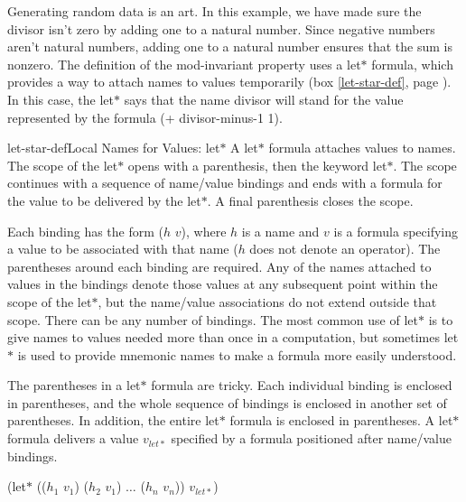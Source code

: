 Generating
random data
is an art.
In this example, we have made sure the divisor isn't zero
by adding one to a natural number.
Since negative numbers aren't natural numbers, adding one
to a natural number ensures that the sum is nonzero.
\label{let-example-brief-explain}
The definition of the \textsf{mod-invariant} property
uses a \textsf{let$*$} formula,
which provides a way to attach names to values temporarily
(box \ref{let-star-def}, page \pageref{let-star-def}).
In this case, the \textsf{let$*$} says that
the name \textsf{divisor} will stand for
the value represented by the formula \textsf{(+ divisor-minus-1 1)}.

\begin{aside}{let-star-def}{Local Names for Values: \textsf{let$*$}}
A
\textsf{let$*$}
formula attaches values to names.
The scope of the \textsf{let$*$} opens with a parenthesis,
then the keyword \textsf{let$*$}.
The scope continues with
a sequence of name/value bindings
and ends with a formula for the value
to be delivered by the \textsf{let$*$}.
A final parenthesis closes the scope.

Each binding has the form ($h$ $v$),
where $h$ is a name and $v$ is a
formula specifying a value to be associated with that name
($h$ does not denote an operator).
The parentheses around each binding are required.
Any of the names attached to values in the bindings
denote those values at any
subsequent point within the scope
of the \textsf{let$*$},
but the name/value associations do not
extend outside that scope.
There can be any number of bindings.
The most common use of \textsf{let$*$} is to give names
to values needed more than once in a computation,
but sometimes \textsf{let$*$} is used to provide mnemonic names
to make a formula more easily understood.

The parentheses in a \textsf{let$*$} formula are tricky.
Each individual binding is enclosed in parentheses,
and the whole sequence of bindings is enclosed in another set
of parentheses. In addition, the entire \textsf{let$*$} formula
is enclosed in parentheses.
A \textsf{let$*$} formula delivers a value $v_{let*}$
specified by a formula positioned after name/value bindings.
\begin{center}
(let$*$ (($h_1$ $v_1$) ($h_2$ $v_1$) $\dots$ ($h_n$ $v_n$)) $v_{let*}$)
\end{center}
\end{aside}

